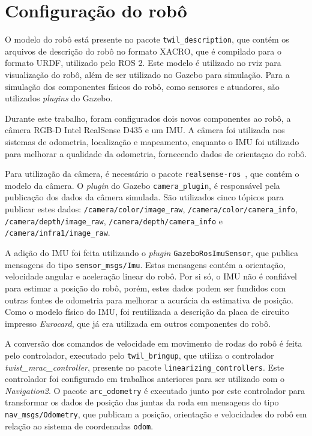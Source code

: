\documentclass[repeatfields,xlists,xpacks,oneside,yearsonly]{ufrgscca}
\begin{document}
\section{Configuração do robô}



O modelo do robô está presente no pacote \texttt{twil\_description}, que contém
os arquivos de descrição do robô no formato XACRO, que é compilado para o formato
URDF, utilizado pelo ROS 2.
Este modelo é utilizado no rviz para visualização do robô, além de ser utilizado
no Gazebo para simulação.
Para a simulação dos componentes físicos do robô, como sensores e atuadores, 
são utilizados \textit{plugins} do Gazebo.

Durante este trabalho, foram configurados dois novos componentes ao robô, a câmera 
RGB-D Intel RealSense D435 e um IMU.
A câmera foi utilizada nos sistemas de odometria, localização e mapeamento, 
enquanto o IMU foi utilizado para melhorar a qualidade da odometria,
fornecendo dados de orientaçao do robô.

Para utilização da câmera, é necessário o pacote 
\texttt{realsense-ros}~\cite{realsense_ros}, que contém o modelo da câmera.
O \textit{plugin} do Gazebo \texttt{camera\_plugin}, 
é responsável pela publicação dos dados da câmera simulada.
São utilizados cinco tópicos para publicar estes dados:
\texttt{/camera/color/image\_raw}, \texttt{/camera/color/camera\_info},
\texttt{/camera/depth/image\_raw}, \texttt{/camera/depth/camera\_info} e
\texttt{/camera/infra1/image\_raw}.

A adição do IMU foi feita utilizando o \textit{plugin} 
\texttt{GazeboRosImuSensor}, que publica mensagens do tipo 
\texttt{sensor\_msgs/Imu}. 
Estas mensagens contém a orientação, velocidade angular e aceleração linear do robô.
Por si só, o IMU não é confiável para estimar a posição do robô, porém, estes 
dados podem ser fundidos com outras fontes de odometria para melhorar a 
acurácia da estimativa de posição.
Como o modelo físico do IMU, foi reutilizada 
a descrição da placa de circuito impresso \textit{Eurocard}, 
que já era utilizada em outros componentes do robô.

A conversão dos comandos de velocidade em movimento de rodas do 
robô é feita pelo controlador, executado pelo \texttt{twil\_bringup}, 
que utiliza o controlador \textit{twist\_mrac\_controller}, 
presente no pacote \texttt{linearizing\_controllers}.
Este controlador foi configurado em trabalhos anteriores para
ser utilizado com o \textit{Navigation2}.
O pacote \texttt{arc\_odometry} é executado junto por este 
controlador para transformar os dados de posição das juntas 
da roda em mensagens do tipo \texttt{nav\_msgs/Odometry}, 
que publicam a posição, orientação e velocidades do robô em relação 
ao sistema de coordenadas \texttt{odom}.
\end{document}
